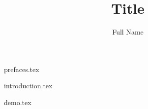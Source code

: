 \documentclass[
    a4paper,
    12pt
]{report}
\title{Title}
\author{Full Name}
\date{}
\begin{document}
\maketitle

{prefaces.tex}

{introduction.tex}

{demo.tex}
\end{document}
